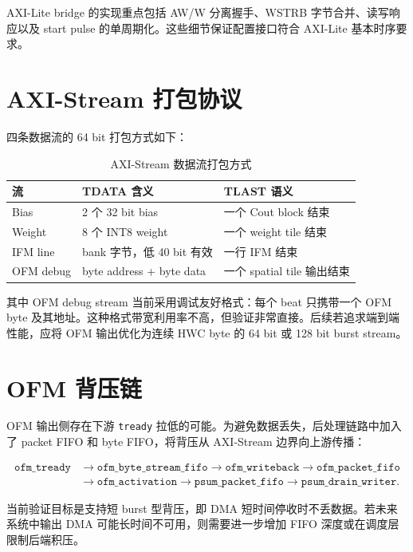 \documentclass[fontset=fandol,ugly,language=chinese]{pkuthss}
\newcommand{\module}[1]{\texttt{#1}}
\newcommand{\signal}[1]{\texttt{#1}}
\begin{document}
AXI-Lite bridge 的实现重点包括 AW/W 分离握手、WSTRB 字节合并、读写响应以及 start pulse 的单周期化。这些细节保证配置接口符合 AXI-Lite 基本时序要求。

\section{AXI-Stream 打包协议}

四条数据流的 64 bit 打包方式如下：

\begin{table}[htbp]
\centering
\caption{AXI-Stream 数据流打包方式}
\label{tab:axis_pack_report}
\begin{tabular}{lll}
\toprule
\textbf{流} & \textbf{TDATA 含义} & \textbf{TLAST 语义} \\
\midrule
Bias & 2 个 32 bit bias & 一个 Cout block 结束 \\
Weight & 8 个 INT8 weight & 一个 weight tile 结束 \\
IFM line & bank 字节，低 40 bit 有效 & 一行 IFM 结束 \\
OFM debug & byte address + byte data & 一个 spatial tile 输出结束 \\
\bottomrule
\end{tabular}
\end{table}

其中 OFM debug stream 当前采用调试友好格式：每个 beat 只携带一个 OFM byte 及其地址。这种格式带宽利用率不高，但验证非常直接。后续若追求端到端性能，应将 OFM 输出优化为连续 HWC byte 的 64 bit 或 128 bit burst stream。

\section{OFM 背压链}

OFM 输出侧存在下游 \signal{tready} 拉低的可能。为避免数据丢失，后处理链路中加入了 packet FIFO 和 byte FIFO，将背压从 AXI-Stream 边界向上游传播：

\begin{equation}
\begin{aligned}
\signal{ofm\_tready}
&\rightarrow \module{ofm\_byte\_stream\_fifo}
\rightarrow \module{ofm\_writeback}
\rightarrow \module{ofm\_packet\_fifo}\\
&\rightarrow \module{ofm\_activation}
\rightarrow \module{psum\_packet\_fifo}
\rightarrow \module{psum\_drain\_writer}.
\end{aligned}
\end{equation}

当前验证目标是支持短 burst 型背压，即 DMA 短时间停收时不丢数据。若未来系统中输出 DMA 可能长时间不可用，则需要进一步增加 FIFO 深度或在调度层限制后端积压。
\end{document}
